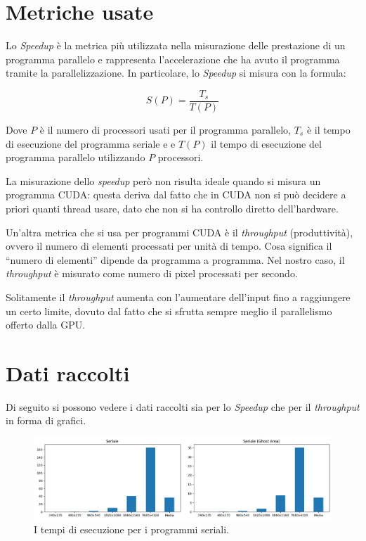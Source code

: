 \documentclass[12pt,a4paper,openright,twoside]{report}
\begin{document}
\section{Metriche usate}

Lo \textit{Speedup} è la metrica più utilizzata nella misurazione delle prestazione di un programma parallelo e rappresenta l'accelerazione che ha avuto il programma tramite la parallelizzazione. In particolare, lo \textit{Speedup} si misura con la formula:

\[ S(P) = \frac{T_{s}}{T(P)}  \]

Dove $P$ è il numero di processori usati per il programma parallelo, $T_{s}$ è il tempo di esecuzione del programma seriale e e $T(P)$ il tempo di esecuzione del programma parallelo utilizzando $P$ processori.

La misurazione dello \textit{speedup} però non risulta ideale quando si misura un programma CUDA: questa deriva dal fatto che in CUDA non si può decidere a priori quanti thread usare, dato che non si ha controllo diretto dell'hardware.

Un'altra metrica che si usa per programmi CUDA è il \textit{throughput} (produttività), ovvero il numero di elementi processati per unità di tempo. Cosa significa il ``numero di elementi'' dipende da programma a programma. Nel nostro caso, il \textit{throughput} è misurato come numero di pixel processati per secondo.

Solitamente il \textit{throughput} aumenta con l'aumentare dell'input fino a raggiungere un certo limite, dovuto dal fatto che si sfrutta sempre meglio il parallelismo offerto dalla GPU.

\section{Dati raccolti}

Di seguito si possono vedere i dati raccolti sia per lo \textit{Speedup} che per il \textit{throughput} in forma di grafici.

\begin{figure}[h]
    \centering
    \includegraphics[width=\textwidth]{graphs_serial.png}
    \caption{I tempi di esecuzione per i programmi seriali.}
    \label{img:times_ser}
\end{figure}
\end{document}
